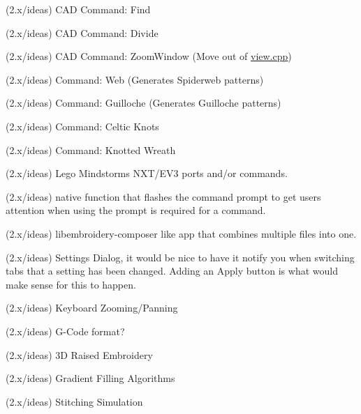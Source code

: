 \begin{DoxyRefList}
\label{todo__todo000303}%
%
(2.\+x/ideas) CAD Command\+: Find

\label{todo__todo000304}%
%
(2.\+x/ideas) CAD Command\+: Divide

\label{todo__todo000305}%
%
(2.\+x/ideas) CAD Command\+: Zoom\+Window (Move out of \mbox{\hyperlink{view_8cpp}{view.\+cpp}})

\label{todo__todo000306}%
%
(2.\+x/ideas) Command\+: Web (Generates Spiderweb patterns)

\label{todo__todo000307}%
%
(2.\+x/ideas) Command\+: Guilloche (Generates Guilloche patterns)

\label{todo__todo000308}%
%
(2.\+x/ideas) Command\+: Celtic Knots

\label{todo__todo000309}%
%
(2.\+x/ideas) Command\+: Knotted Wreath

\label{todo__todo000310}%
%
(2.\+x/ideas) Lego Mindstorms NXT/\+EV3 ports and/or commands.

\label{todo__todo000311}%
%
(2.\+x/ideas) native function that flashes the command prompt to get users attention when using the prompt is required for a command.

\label{todo__todo000312}%
%
(2.\+x/ideas) libembroidery-\/composer like app that combines multiple files into one.

\label{todo__todo000313}%
%
(2.\+x/ideas) Settings Dialog, it would be nice to have it notify you when switching tabs that a setting has been changed. Adding an Apply button is what would make sense for this to happen. 

\label{todo__todo000314}%
%
(2.\+x/ideas) Keyboard Zooming/\+Panning

\label{todo__todo000315}%
%
(2.\+x/ideas) G-\/\+Code format?

\label{todo__todo000316}%
%
(2.\+x/ideas) 3D Raised Embroidery

\label{todo__todo000317}%
%
(2.\+x/ideas) Gradient Filling Algorithms

\label{todo__todo000318}%
%
(2.\+x/ideas) Stitching Simulation


\end{DoxyRefList}
